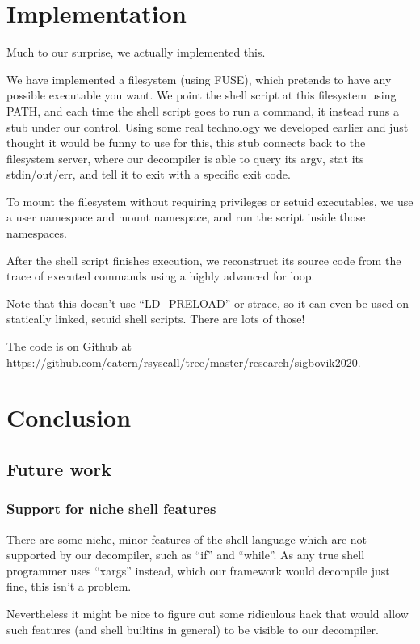 \documentclass[sigplan]{acmart}
\begin{document}
\section{Implementation}\label{implementation}
Much to our surprise, we actually implemented this.

We have implemented a filesystem (using FUSE),
which pretends to have any possible executable you want.
We point the shell script at this filesystem using PATH,
and each time the shell script goes to run a command,
it instead runs a stub under our control.
Using some real technology we developed earlier and just thought it would be funny to use for this,
this stub connects back to the filesystem server,
where our decompiler is able to query its argv, stat its stdin/out/err, and tell it to exit with a specific exit code.

To mount the filesystem without requiring privileges or setuid executables,
we use a user namespace and mount namespace, and run the script inside those namespaces.

After the shell script finishes execution,
we reconstruct its source code from the trace of executed commands
using a highly advanced for loop.

Note that this doesn't use ``LD\_PRELOAD'' or strace,
so it can even be used on statically linked, setuid shell scripts.
There are lots of those!

The code is on Github at
\url{https://github.com/catern/rsyscall/tree/master/research/sigbovik2020}.

\section{Conclusion}\label{conclusion}
\subsection{Future work}
\subsubsection{Support for niche shell features}
There are some niche, minor features of the shell language which are not supported by our decompiler,
such as ``if'' and ``while''.
As any true shell programmer uses ``xargs'' instead,
which our framework would decompile just fine,
this isn't a problem.

Nevertheless it might be nice to figure out some ridiculous hack that would allow such features
(and shell builtins in general)
to be visible to our decompiler.
\end{document}
